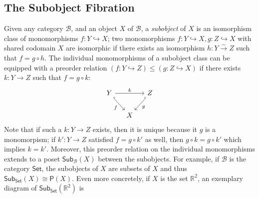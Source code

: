 \documentclass[10pt]{article}
\theoremstyle{definition}
\theoremstyle{remark}
\newcommand{\set}{\mathsf{Set}} %
\newcommand{\sub}{\mathsf{Sub}} %
\newcommand{\pow}{\mathsf{P}} %
\newcommand{\catB}{\mathcal{B}}
\begin{document}
\subsection{The Subobject Fibration}

Given any category $\catB$, and an object $X$ of $\catB$, a \textit{subobject} of $X$ is an isomorphism class of monomorphisms $f : Y \hookrightarrow X$; two monomorphisms $f : Y \hookrightarrow X, g : Z \hookrightarrow
X$ with shared codomain $X$ are isomorphic if there exists an isomorphism $h : Y \xrightarrow{\sim} Z$ such that $f = g \circ h$. The individual monomorphisms of a subobject class can be equipped with a preorder relation $( f : Y \hookrightarrow Z ) \leq ( g : Z \hookrightarrow X )$ if there exists $k : Y \rightarrow Z$ such that $f = g \circ k$:
\begin{equation}
    \begin{tikzcd}[column sep=small]
        Y \ar[rd, hook, "f"'] \ar[rr, "k"] &   & Z \ar[ld, hook', "g"]\\
          & X & 
    \end{tikzcd}
\end{equation}
Note that if such a $k : Y \to Z$ exists, then it is unique because it $g$ is a monomorpism; if $k' : Y \rightarrow Z$ satisfied $f = g \circ k'$ as well, then $g \circ k = g \circ k'$ which implies $k = k'$. Moreover, this preorder relation on the individual monomorphisms extends to a poset $\sub_{\catB}(X)$ between the subobjects. For example, if $\catB$ is the category $\set$, the subobjects of $X$ are subsets of $X$ and thus $\sub_{\set}(X) \cong \pow(X)$. Even more concretely, if $X$ is the set $\mathbb{R}^2$, an exemplary diagram of $\sub_{\set}(\mathbb{R}^2)$ is
\end{document}
